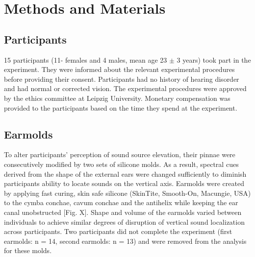 \section{Methods and Materials}\label{sec2}%
\subsection{Participants}
15 participants (11- females and 4 males, mean age 23 $\pm$ 3 years) took part in the experiment.
They were informed about the relevant experimental procedures before providing their consent. Participants had no history of hearing disorder and had normal or corrected vision. The experimental procedures were approved by the ethics committee at Leipzig University. Monetary compensation was provided to the participants based on the time they spend at the experiment.

\subsection{Earmolds}
To alter participants’ perception of sound source elevation, their pinnae were consecutively modified by two sets of silicone molds. As a result, spectral cues derived from the shape of the external ears were changed sufficiently to diminish participants ability to locate sounds on the vertical axis. Earmolds were created by applying fast curing, skin safe silicone (SkinTite, Smooth-On, Macungie, USA) to the cymba conchae, cavum conchae and the antihelix while keeping the ear canal unobstructed [Fig. X]. Shape and volume of the earmolds varied between individuals to achieve similar degrees of disruption of vertical sound localization across participants. Two participants did not complete the experiment (first earmolds: n = 14, second earmolds: n = 13) and were removed from the analysis for these molds. 

